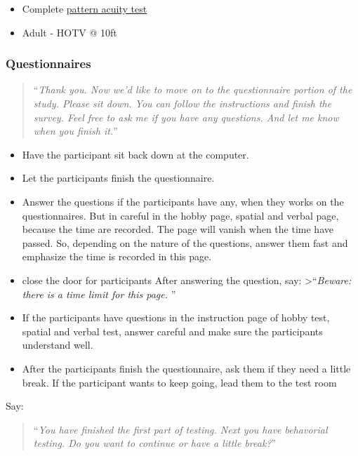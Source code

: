 \documentclass[]{article}
\providecommand{\tightlist}{%
  \setlength{\itemsep}{0pt}\setlength{\parskip}{0pt}}
\begin{document}
\begin{itemize}
\tightlist
\item
  Complete \href{vision-screening-protocol.html}{pattern acuity test}
\item
  Adult - HOTV @ 10ft
\end{itemize}

\subsubsection{Questionnaires}\label{questionnaires}

\begin{quote}
``\emph{Thank you. Now we'd like to move on to the questionnaire portion
of the study. Please sit down. You can follow the instructions and
finish the survey. Feel free to ask me if you have any questions. And
let me know when you finish it.}''
\end{quote}

\begin{itemize}
\item
  Have the participant sit back down at the computer.
\item
  Let the participants finish the questionnaire.
\item
  Answer the questions if the participants have any, when they works on
  the questionnaires. But in careful in the hobby page, spatial and
  verbal page, because the time are recorded. The page will vanish when
  the time have passed. So, depending on the nature of the questions,
  answer them fast and emphasize the time is recorded in this page.
\item
  close the door for participants After answering the question, say:
  \textgreater{}``\emph{Beware: there is a time limit for this page. }''
\item
  If the participants have questions in the instruction page of hobby
  test, spatial and verbal test, answer careful and make sure the
  participants understand well.
\item
  After the participants finish the questionnaire, ask them if they need
  a little break. If the participant wants to keep going, lead them to
  the test room
\end{itemize}

Say:

\begin{quote}
``\emph{You have finished the first part of testing. Next you have
behavorial testing. Do you want to continue or have a little break?}''
\end{quote}
\end{document}
